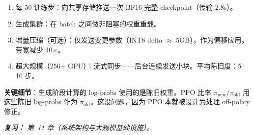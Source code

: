 \begin{questionbox}
\begin{enumerate}
  \item 每 50 训练步：向共享存储推送一次 BF16 完整 checkpoint（传输 2.8s）。
  \item 生成集群：在 batch 之间做非阻塞的权重重载。
  \item 增量压缩（可选）：仅发送变更参数（INT8 delta $\approx$ 5GB），作为偏移应用。带宽减少 10$\times$。
  \item 超大规模（256+ GPU）：流式同步——后台连续发送小块。平均陈旧度：5--10 步。
\end{enumerate}

\textbf{关键细节}：生成阶段计算的 log-probs 使用的是陈旧权重。PPO 比率 $\pi_\text{new}/\pi_\text{old}$ 用这些陈旧 log-probs 作为 $\pi_\text{old}$。这没问题，因为 PPO 本就被设计为处理 off-policy 修正。

\emph{\textbf{复习：} 第~11 章（系统架构与大规模基础设施）。}
\end{questionbox}

